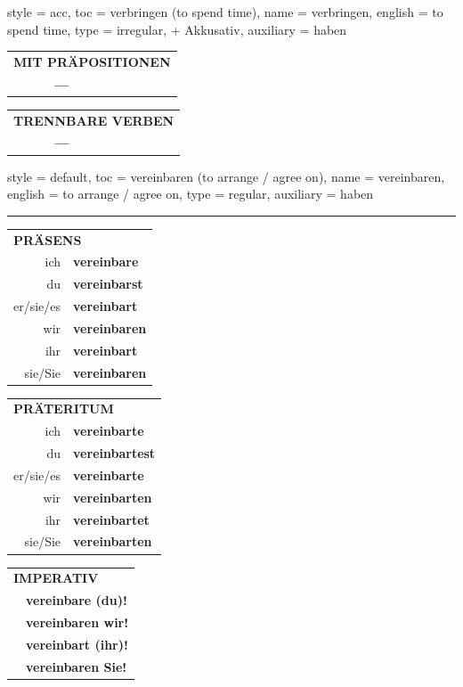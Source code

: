 \begin{verbentry}{
  style = {acc},
  toc = {verbringen (to spend time)},
  name = {verbringen},
  english = {to spend time},
  type = {irregular, + Akkusativ},
  auxiliary = {haben}
}
\vspace{10pt}

\begin{tabular}{lll}
\multicolumn{3}{l}{\textbf{MIT PRÄPOSITIONEN}}\\
& \textbf{---} & \\
\end{tabular}
\hfill
\begin{tabular}{lll}
\multicolumn{3}{l}{\textbf{TRENNBARE VERBEN}}\\
& \textbf{---} & \\
\end{tabular}

\vspace{-5pt}
\end{verbentry}

\begin{verbentry}{
  style = {default},
  toc = {vereinbaren (to arrange / agree on)},
  name = {vereinbaren},
  english = {to arrange / agree on},
  type = {regular},
  auxiliary = {haben}
}


\vspace{5pt}
\hrule
\vspace{5pt}

\begin{tabular}{rl}
\multicolumn{2}{l}{\textbf{PRÄSENS}}\\
ich & \textbf{vereinbare}\\
du & \textbf{vereinbarst}\\
er/sie/es & \textbf{vereinbart}\\
wir & \textbf{vereinbaren}\\
ihr & \textbf{vereinbart}\\
sie/Sie & \textbf{vereinbaren}\\
\end{tabular}
\hfill
\begin{tabular}{rl}
\multicolumn{2}{l}{\textbf{PRÄTERITUM}}\\
ich & \textbf{vereinbarte}\\
du & \textbf{vereinbartest}\\
er/sie/es & \textbf{vereinbarte}\\
wir & \textbf{vereinbarten}\\
ihr & \textbf{vereinbartet}\\
sie/Sie & \textbf{vereinbarten}\\
\end{tabular}
\hfill
\begin{tabular}{rl}
\multicolumn{2}{l}{\textbf{IMPERATIV}}\\
& \textbf{vereinbare (du)!}\\
& \textbf{vereinbaren wir!}\\
& \textbf{vereinbart (ihr)!}\\
& \textbf{vereinbaren Sie!}\\
\end{tabular}


\end{verbentry}
